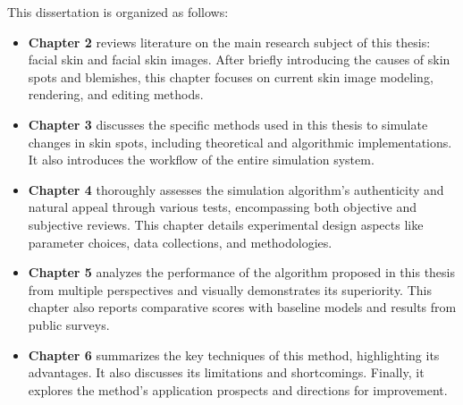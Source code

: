 \begin{spacing}{1.5}
This dissertation is organized as follows:
\begin{itemize}
    \item \textbf{Chapter 2} reviews literature on the main research subject of this thesis: facial skin and facial skin images. After briefly introducing the causes of skin spots and blemishes, this chapter focuses on current skin image modeling, rendering, and editing methods.
    \item \textbf{Chapter 3} discusses the specific methods used in this thesis to simulate changes in skin spots, including theoretical and algorithmic implementations. It also introduces the workflow of the entire simulation system.
    \item \textbf{Chapter 4} thoroughly assesses the simulation algorithm's authenticity and natural appeal through various tests, encompassing both objective and subjective reviews. This chapter details experimental design aspects like parameter choices, data collections, and methodologies.
    \item \textbf{Chapter 5} analyzes the performance of the algorithm proposed in this thesis from multiple perspectives and visually demonstrates its superiority. This chapter also reports comparative scores with baseline models and results from public surveys.
    \item \textbf{Chapter 6} summarizes the key techniques of this method, highlighting its advantages. It also discusses its limitations and shortcomings. Finally, it explores the method's application prospects and directions for improvement.
\end{itemize}

\end{spacing}
\newpage


